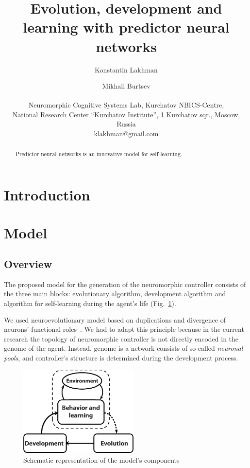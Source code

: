 \documentclass[letterpaper]{article}
\title{Evolution, development and learning with predictor neural networks}
\author{Konstantin Lakhman \and Mikhail Burtsev \\
\mbox{}\\
Neuromorphic Cognitive Systems Lab, Kurchatov NBICS-Centre, \\
National Research Center ``Kurchatov Institute'', 1 Kurchatov sqr., Moscow, Russia \\
klakhman@gmail.com}
\begin{document}
\maketitle

\begin{abstract}
	Predictor neural networks is an innovative model for self-learning.
\end{abstract}

\section{Introduction}

\section{Model}

\subsection{Overview}

The proposed model for the generation of the neuromorphic controller consists of the three main blocks: evolutionary algorithm, development algorithm and algorithm for self-learning during the agent's life (Fig.~\ref{Model_Overview}).

We used neuroevolutionary model based on duplications and divergence of neurons' functional roles~\citep{LakhmanBurtsev2013}. We had to adapt this principle because in the current research the topology of neuromorphic controller is not directly encoded in the genome of the agent.  
Instead, genome is a network consists of so-called {\em neuronal pools}, and controller's structure is determined during the development process.

\begin{figure}[b!]
\begin{center}
\includegraphics[width=6cm]{Fig1_Model_Overview.eps}
\caption{Schematic representation of the model's components}
\label{Model_Overview}
\end{center}
\end{figure}
\end{document}
